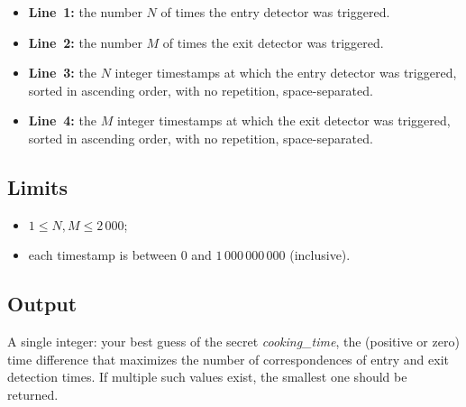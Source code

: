 \begin{itemize}
  \item \textbf{Line~1:} the number $N$ of times the entry detector
  was triggered.
\item \textbf{Line~2:} the number $M$ of times the exit detector
  was triggered.
\item \textbf{Line~3:} the $N$ integer timestamps at which the entry detector
  was triggered, sorted in ascending order, with no repetition, space-separated.
\item \textbf{Line~4:} the $M$ integer timestamps at which the exit detector was
  triggered, sorted in ascending order, with no repetition, space-separated.
\end{itemize}

\subsection*{Limits}

\begin{itemize}

\item $1\leq N,M \leq 2\,000$;

\item each timestamp is between 0 and $1\,000\,000\,000$ (inclusive).

\end{itemize}

\subsection*{Output}

A single integer: your best guess of the secret \emph{cooking\_time}, the
(positive or zero) time difference
that maximizes the number of
correspondences of entry and exit detection times. If multiple such
values exist, the smallest one should be returned.
